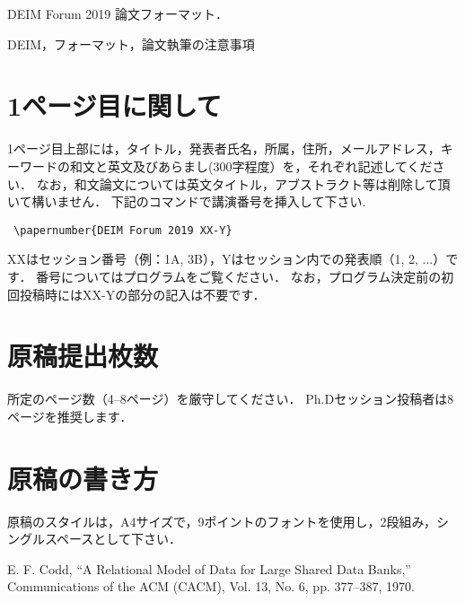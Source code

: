 \documentclass[uplatex]{deimj}
\begin{document}
\pagestyle{empty}
\begin{jabstract}
DEIM Forum 2019 論文フォーマット．
\end{jabstract}
\begin{jkeyword}
DEIM，フォーマット，論文執筆の注意事項
\end{jkeyword}
\maketitle

\section{1ページ目に関して}

1ページ目上部には，タイトル，発表者氏名，所属，住所，メールアドレス，キーワードの和文と英文及びあらまし(300字程度）を，それぞれ記述してください．
なお，和文論文については英文タイトル，アブストラクト等は削除して頂いて構いません．
下記のコマンドで講演番号を挿入して下さい.
\begin{verbatim}
 \papernumber{DEIM Forum 2019 XX-Y}
\end{verbatim}
XXはセッション番号（例：1A, 3B），Yはセッション内での発表順（1, 2, ...）です．
番号についてはプログラムをご覧ください．
なお，プログラム決定前の初回投稿時にはXX-Yの部分の記入は不要です．

\section{原稿提出枚数}

所定のページ数（4--8ページ）を厳守してください．
Ph.Dセッション投稿者は8ページを推奨します．

\section{原稿の書き方}

原稿のスタイルは，A4サイズで，9ポイントのフォントを使用し，2段組み，シングルスペースとして下さい．

\vspace{2em}

\begin{thebibliography}{99}
  E. F. Codd,
  ``A Relational Model of Data for Large Shared Data Banks,''
  Communications of the {ACM} (CACM), Vol. 13, No. 6, pp. 377--387, 1970.
\end{thebibliography}
\end{document}
